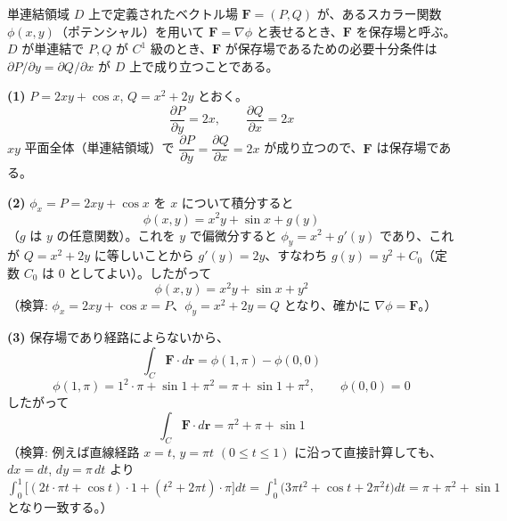 
単連結領域 $D$ 上で定義されたベクトル場 $\bm{F} = (P, Q)$ が、あるスカラー関数 $\phi(x,y)$（ポテンシャル）を用いて $\bm{F} = \nabla \phi$ と表せるとき、$\bm{F}$ を保存場と呼ぶ。$D$ が単連結で $P, Q$ が $C^{1}$ 級のとき、$\bm{F}$ が保存場であるための必要十分条件は $\partial P/\partial y = \partial Q/\partial x$ が $D$ 上で成り立つことである。

\textbf{(1)} $P = 2xy + \cos x$, $Q = x^{2} + 2y$ とおく。
\[
\frac{\partial P}{\partial y} = 2x, \qquad \frac{\partial Q}{\partial x} = 2x
\]
$xy$ 平面全体（単連結領域）で $\dfrac{\partial P}{\partial y} = \dfrac{\partial Q}{\partial x} = 2x$ が成り立つので、$\bm{F}$ は保存場である。

\textbf{(2)} $\phi_x = P = 2xy + \cos x$ を $x$ について積分すると
\[
\phi(x,y) = x^{2}y + \sin x + g(y)
\]
（$g$ は $y$ の任意関数）。これを $y$ で偏微分すると $\phi_y = x^{2} + g'(y)$ であり、これが $Q = x^{2} + 2y$ に等しいことから $g'(y) = 2y$、すなわち $g(y) = y^{2} + C_0$（定数 $C_0$ は $0$ としてよい）。したがって
\[
\boxed{\; \phi(x,y) = x^{2}y + \sin x + y^{2} \;}
\]
（検算: $\phi_x = 2xy + \cos x = P$、$\phi_y = x^{2} + 2y = Q$ となり、確かに $\nabla\phi = \bm{F}$。）

\textbf{(3)} 保存場であり経路によらないから、
\[
\int_{C} \bm{F}\cdot d\bm{r} = \phi(1,\pi) - \phi(0,0)
\]
\[
\phi(1,\pi) = 1^{2}\cdot \pi + \sin 1 + \pi^{2} = \pi + \sin 1 + \pi^{2}, \qquad \phi(0,0) = 0
\]
したがって
\[
\boxed{\; \int_{C} \bm{F}\cdot d\bm{r} = \pi^{2} + \pi + \sin 1 \;}
\]
（検算: 例えば直線経路 $x=t$, $y=\pi t$ $(0\le t\le 1)$ に沿って直接計算しても、$dx=dt$, $dy=\pi\,dt$ より
$\int_0^1 \bigl[(2t\cdot\pi t+\cos t)\cdot 1 + (t^2+2\pi t)\cdot \pi\bigr]dt = \int_0^1 \bigl(3\pi t^2+\cos t+2\pi^2 t\bigr)dt = \pi + \pi^2 + \sin 1$ となり一致する。）
